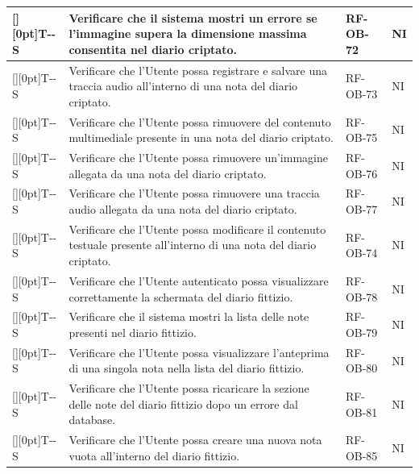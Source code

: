 \documentclass[a4paper,12pt]{article}
\newcounter{testsys}
\newcommand{\systestcode}{%
  \raisebox{0pt}[\height][0pt]{\hypertarget{T-\arabic{testsys}-S}{}}T-\arabic{testsys}-S%
}
\begin{document}
\begin{longtable}{| >{\centering\arraybackslash}p{} | >{\raggedright\arraybackslash}p{} | >{\centering\arraybackslash}p{} | >{\centering\arraybackslash}p{} |}
\stepcounter{testsys} \systestcode & Verificare che il sistema mostri un errore se l'immagine supera la dimensione massima consentita nel diario criptato. & RF-OB-72 & NI \\
\hline

\stepcounter{testsys} \systestcode & Verificare che l'Utente possa registrare e salvare una traccia audio all'interno di una nota del diario criptato. & RF-OB-73 & NI \\
\hline

\stepcounter{testsys} \systestcode & Verificare che l'Utente possa rimuovere del contenuto multimediale presente in una nota del diario criptato. & RF-OB-75 & NI \\
\hline

\stepcounter{testsys} \systestcode & Verificare che l'Utente possa rimuovere un'immagine allegata da una nota del diario criptato. & RF-OB-76 & NI \\
\hline

\stepcounter{testsys} \systestcode & Verificare che l'Utente possa rimuovere una traccia audio allegata da una nota del diario criptato. & RF-OB-77 & NI \\
\hline

\stepcounter{testsys} \systestcode & Verificare che l'Utente possa modificare il contenuto testuale presente all'interno di una nota del diario criptato. & RF-OB-74 & NI \\
\hline

\stepcounter{testsys} \systestcode & Verificare che l'Utente autenticato possa visualizzare correttamente la schermata del diario fittizio. & RF-OB-78 & NI \\
\hline

\stepcounter{testsys} \systestcode & Verificare che il sistema mostri la lista delle note presenti nel diario fittizio. & RF-OB-79 & NI \\
\hline

\stepcounter{testsys} \systestcode & Verificare che l'Utente possa visualizzare l'anteprima di una singola nota nella lista del diario fittizio. & RF-OB-80 & NI \\
\hline

\stepcounter{testsys} \systestcode & Verificare che l'Utente possa ricaricare la sezione delle note del diario fittizio dopo un errore dal database. & RF-OB-81 & NI \\
\hline

\stepcounter{testsys} \systestcode & Verificare che l'Utente possa creare una nuova nota vuota all'interno del diario fittizio. & RF-OB-85 & NI \\
\hline


\end{longtable}
\end{document}
